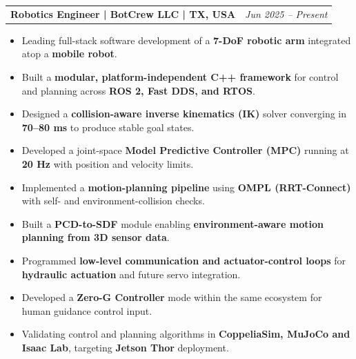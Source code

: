 \documentclass[a4paper,11pt]{article}
\makeatletter
\newcommand{\resumeExp}[2]{
\vspace{0mm}\item[]
    \begin{tabular*}{\textwidth}[t]{l@{\extracolsep{\fill}}r}
        \hspace{-4.4mm} \small\textbf{#1} & {\footnotesize{#2}} \vspace{-1.2mm} %
    \end{tabular*}
    \vspace*{-7mm}
}
\newcommand{\resumeItemListStart}{\begin{justify}\begin{itemize}[leftmargin=1.5ex, rightmargin=2ex, noitemsep,labelsep=1.2mm,itemsep=1mm]\small}
\newcommand{\resumeItemListEnd}{\end{itemize}\end{justify}}%
\makeatother
\begin{document}
\resumeExp
{Robotics Engineer\textnormal{ | BotCrew LLC | TX, USA}}
{\textit{Jun 2025 – Present}}
\resumeItemListStart
\item[$\bullet$] Leading full-stack software development of a \textbf{7-DoF robotic arm} integrated atop a \textbf{mobile robot}.
\item[$\bullet$] Built a \textbf{modular, platform-independent C++ framework} for control and planning across \textbf{ROS 2, Fast DDS, and RTOS}.
\item[$\bullet$] Designed a \textbf{collision-aware inverse kinematics (IK)} solver converging in \textbf{70–80 ms} to produce stable goal states.
\item[$\bullet$] Developed a joint-space \textbf{Model Predictive Controller (MPC)} running at \textbf{20 Hz} with position and velocity limits.
\item[$\bullet$] Implemented a \textbf{motion-planning pipeline} using \textbf{OMPL (RRT-Connect)} with self- and environment-collision checks.
\item[$\bullet$] Built a \textbf{PCD-to-SDF} module enabling \textbf{environment-aware motion planning from 3D sensor data}.
\item[$\bullet$] Programmed \textbf{low-level communication and actuator-control loops} for \textbf{hydraulic actuation} and future servo integration.
\item[$\bullet$] Developed a \textbf{Zero-G Controller} mode within the same ecosystem for human guidance control input.
\item[$\bullet$] Validating control and planning algorithms in \textbf{CoppeliaSim, MuJoCo and Isaac Lab}, targeting \textbf{Jetson Thor} deployment.
\resumeItemListEnd
\end{document}
